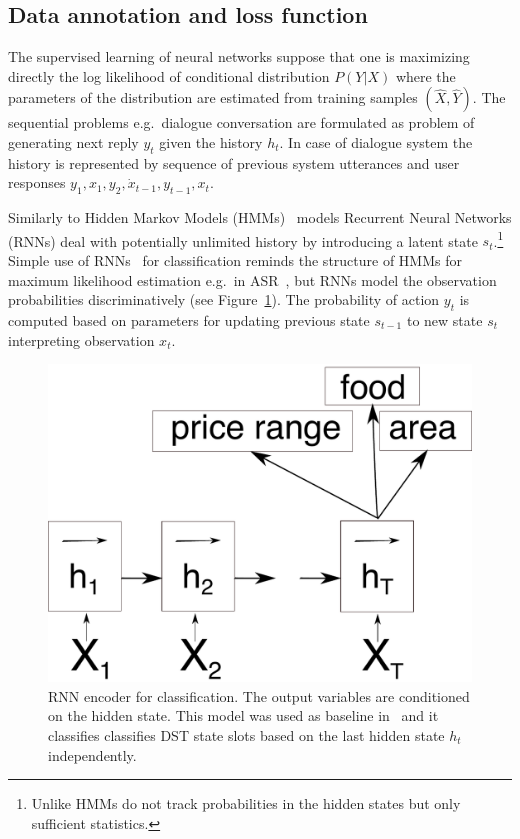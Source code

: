 \documentclass[11pt]{article}
\begin{document}
\subsection{Data annotation and loss function}
\label{sub:data_annotation}

The supervised learning of neural networks suppose that one is maximizing directly the log likelihood of conditional distribution $ P(Y| X) $ where the parameters of the distribution are estimated from training samples $ (\hat{X}, \hat{Y}) $.
The sequential problems e.g.\ dialogue conversation are formulated as problem of generating next reply $y_t$ given the history $h_t$.
In case of dialogue system the history is represented by sequence of previous system utterances and user responses $ y_1, x_1, y_2, \dot x_{t-1}, y_{t-1}, x_t $.

Similarly to Hidden Markov Models (HMMs)~\cite{huang_hidden_1990} models Recurrent Neural Networks (RNNs) deal with potentially unlimited history by introducing a latent state $s_t$.\footnote{Unlike HMMs do not track probabilities in the hidden states but only sufficient statistics.}
Simple use of  RNNs~\cite{gers_learning_2000} for classification reminds the structure of HMMs for maximum likelihood estimation e.g.\ in ASR~\cite{huang_hidden_1990}, but RNNs model the observation probabilities discriminatively (see Figure~\ref{fig:encoder}).
The probability of action $ y_t $ is computed based on parameters for updating previous state $s_{t-1}$ to new state $s_t$ interpreting observation $x_t$.

\begin{figure}[htpb]
    \centering
    \includegraphics[width=0.8\linewidth]{encoder}
    \caption{RNN encoder for classification. The output variables are conditioned on the hidden state. This model was used as baseline in~\cite{platek_recurrent_2016} and it classifies classifies DST state slots based on the last hidden state $h_t$ independently.}
    \label{fig:encoder}
\end{figure}
\end{document}
